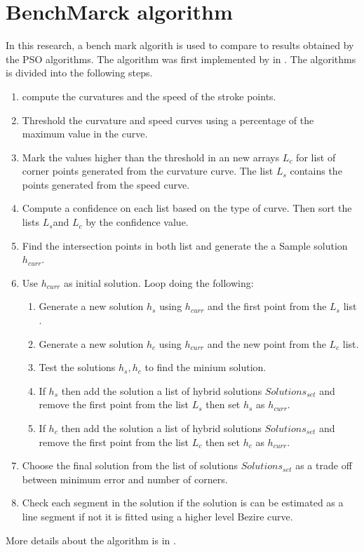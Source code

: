 \section{BenchMarck algorithm}
\label{sec:BenchMarckAlgorithm}
In this research, a bench mark algorith is used to compare to results obtained by the PSO algorithms. The algorithm was first implemented by  \citeauthor{earlyprocess} in \cite{earlyprocess}. The \citeauthor{earlyprocess} algorithms is divided into the following steps. 
\begin{enumerate}
	\item compute the curvatures and the speed of the stroke points. 
	\item Threshold the curvature and speed curves using a percentage of the maximum value in the curve. 
	\item Mark the values higher than the threshold in an new arrays $L_c$ for list of corner points generated from the curvature curve. The list $L_s$ contains the points generated from the speed curve.
	\item Compute a confidence on each list based on the type of curve. Then sort the lists $L_s$and $L_c$ by the confidence value. 
	\item Find the intersection points in both list and generate the a Sample solution $h_{curr}$. 
	\item Use $h_{curr}$ as initial solution. Loop doing the following:
	
		\begin{enumerate}
			\item Generate a new solution $h_{s}$ using $h_{curr}$ and  the first point from the $L_s$ list .
			\item Generate a new solution $h_{c}$ using $h_{curr}$ and  the new point from the $L_c$ list.
			\item Test the solutions $h_{s},h_c$ to find the minium solution.
			\item  If $h_s$ then add the solution a list of hybrid solutions $Solutions_{set}$ and remove the first point from the list $L_s$ then set $h_s$ as $h_{curr}$. 
			\item If $h_c$ then add the solution a list of hybrid solutions $Solutions_{set}$ and remove the first point from the list $L_c$ then set $h_c$ as $h_{curr}$. 
		\end{enumerate}
		\item Choose the final solution from the list of solutions $Solutions_{set}$ as a trade off between  minimum error and number of corners.  
		\item Check each segment in the solution if the solution is can be estimated as a line segment if not it is fitted using a higher level Bezire curve. 
\end{enumerate}
More details about the algorithm is in \cite{earlyprocess}.


